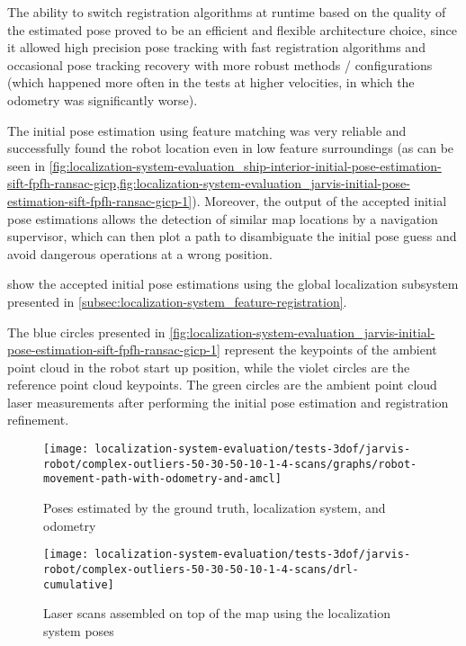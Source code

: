 The ability to switch registration algorithms at runtime based on the quality of the estimated pose proved to be an efficient and flexible architecture choice, since it allowed high precision pose tracking with fast registration algorithms and occasional pose tracking recovery with more robust methods / configurations (which happened more often in the tests at higher velocities, in which the odometry was significantly worse).

The initial pose estimation using feature matching was very reliable and successfully found the robot location even in low feature surroundings (as can be seen in \cref{fig:localization-system-evaluation_ship-interior-initial-pose-estimation-sift-fpfh-ransac-gicp,fig:localization-system-evaluation_jarvis-initial-pose-estimation-sift-fpfh-ransac-gicp-1}). Moreover, the output of the accepted initial pose estimations allows the detection of similar map locations by a navigation supervisor, which can then plot a path to disambiguate the initial pose guess and avoid dangerous operations at a wrong position.

 show the accepted initial pose estimations using the global localization subsystem presented in \cref{subsec:localization-system_feature-registration}.

The blue circles presented in \cref{fig:localization-system-evaluation_jarvis-initial-pose-estimation-sift-fpfh-ransac-gicp-1} represent the keypoints of the ambient point cloud in the robot start up position, while the violet circles are the reference point cloud keypoints. The green circles are the ambient point cloud laser measurements after performing the initial pose estimation and registration refinement.


\begin{figure}[H]
	\centering
	\texttt{[image: localization-system-evaluation/tests-3dof/jarvis-robot/complex-outliers-50-30-50-10-1-4-scans/graphs/robot-movement-path-with-odometry-and-amcl]}
	\caption{Poses estimated by the ground truth, localization system,  and odometry}
	\label{fig:localization-system-evaluation_complex-path-with-outliers-50-30-50-10cm-per-sec-velocity-1-4-scans-paths}
\end{figure}

\begin{figure}[H]
	\centering
	\texttt{[image: localization-system-evaluation/tests-3dof/jarvis-robot/complex-outliers-50-30-50-10-1-4-scans/drl-cumulative]}
	\caption{Laser scans assembled on top of the map using the localization system poses}
	\label{fig:localization-system-evaluation_complex-path-with-outliers-50-30-50-10cm-per-sec-velocity-1-4-scans-drl-cumulative}
\end{figure}

